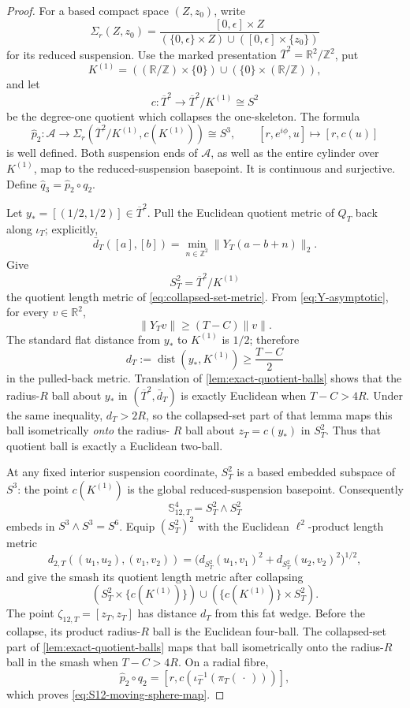 \documentclass[11pt,letterpaper]{article}
\numberwithin{equation}{section}
\theoremstyle{definition}
\theoremstyle{remark}
\newcommand{\R}{\mathbb R}
\newcommand{\Z}{\mathbb Z}
\begin{document}
\begin{proof}
For a based compact space \((Z,z_0)\), write
\[
 \Sigma_r(Z,z_0)=
 \frac{[0,\epsilon]\times Z}
 {(\{0,\epsilon\}\times Z)\cup([0,\epsilon]\times\{z_0\})}
\]
for its reduced suspension.  Use the marked presentation
\(\overline T^2=\R^2/\Z^2\), put
\[
 K^{(1)}
 =((\R/\Z)\times\{0\})\cup(\{0\}\times(\R/\Z)),
\]
and let
\[
 c:\overline T^2\longrightarrow\overline T^2/K^{(1)}\cong S^2
\]
be the degree-one quotient which collapses the one-skeleton.  The formula
\[
 \widehat p_2:\mathcal A\longrightarrow
 \Sigma_r(\overline T^2/K^{(1)},c(K^{(1)}))\cong S^3,
 \qquad
 [r,e^{i\phi},u]\longmapsto[r,c(u)]
\]
is well defined.  Both suspension ends of \(\mathcal A\), as well as the
entire cylinder over \(K^{(1)}\), map to the reduced-suspension basepoint.
It is continuous and surjective.  Define
\(\widehat q_3=\widehat p_2\circ q_2\).

Let \(y_*=[(1/2,1/2)]\in\overline T^2\).  Pull the Euclidean quotient
metric of \(Q_T\) back along \(\iota_T\); explicitly,
\begin{equation}
 \bar d_T([a],[b])
 =\min_{n\in\Z^2}\|Y_T(a-b+n)\|_2.
 \label{eq:marked-Q-metric}
\end{equation}
Give
\[
 S_T^2=\overline T^2/K^{(1)}
\]
the quotient length metric of \cref{eq:collapsed-set-metric}.  From
\cref{eq:Y-asymptotic}, for every
\(v\in\R^2\),
\[
 \|Y_Tv\|\geq(T-C)\|v\|.
\]
The standard flat distance from \(y_*\) to \(K^{(1)}\) is \(1/2\);
therefore
\begin{equation}
 d_T:=\operatorname{dist}(y_*,K^{(1)})
 \geq\frac{T-C}{2}
 \label{eq:distance-to-one-skeleton}
\end{equation}
in the pulled-back metric.  Translation of
\cref{lem:exact-quotient-balls} shows that the radius-\(R\) ball about
\(y_*\) in \((\overline T^2,\bar d_T)\) is exactly Euclidean when
\(T-C>4R\).  Under the same inequality, \(d_T>2R\), so the collapsed-set
part of that lemma maps this ball isometrically \emph{onto} the radius-
\(R\) ball about \(z_T=c(y_*)\) in \(S_T^2\).  Thus that quotient ball is
exactly a Euclidean two-ball.

At any fixed interior suspension coordinate, \(S_T^2\) is a based
embedded subspace of \(S^3\): the point \(c(K^{(1)})\) is the global
reduced-suspension basepoint.  Consequently
\[
 \mathbb S_{12,T}^4=S_T^2\wedge S_T^2
\]
embeds in \(S^3\wedge S^3=S^6\).  Equip \((S_T^2)^2\) with the
Euclidean \(\ell^2\)-product length metric
\[
 d_{2,T}((u_1,u_2),(v_1,v_2))
 =\bigl(d_{S_T^2}(u_1,v_1)^2+d_{S_T^2}(u_2,v_2)^2\bigr)^{1/2},
\]
and give the smash its quotient length metric after collapsing
\[
 (S_T^2\times\{c(K^{(1)})\})
 \cup(\{c(K^{(1)})\}\times S_T^2).
\]
The point \(\zeta_{12,T}=[z_T,z_T]\) has distance \(d_T\) from this fat
wedge.  Before the collapse, its product radius-\(R\) ball is the Euclidean
four-ball.  The collapsed-set part of
\cref{lem:exact-quotient-balls} maps that ball isometrically onto the
radius-\(R\) ball in the smash when \(T-C>4R\).  On a radial fibre,
\[
 \widehat p_2\circ q_2
 =[r,c(\iota_T^{-1}(\pi_T(\,\cdot\,)))],
\]
which proves \cref{eq:S12-moving-sphere-map}.


\end{proof}
\end{document}
